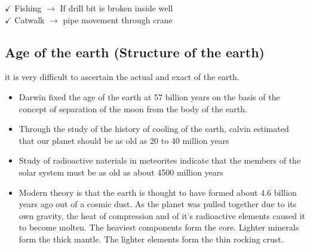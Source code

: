 \documentclass{article}
\begin{document}
$\checkmark$ Fishing $\rightarrow$ If drill bit is broken inside well \\
$\checkmark$ Catwalk $\rightarrow$ pipe movement through crane 

\subsection*{Age of the earth (Structure of the earth)}
it is very difficult to ascertain the actual and exact of the earth. 
\begin{itemize}
  \item Darwin fixed the age of the earth at 57 billion years on the basis of the concept of separation of the moon from the body of the earth.
  \item Through the study of the history of cooling of the earth, calvin estimated that our planet should be as old as 20 to 40 million years 
  \item Study of radioactive naterials in meteorites indicate that the members of the solar system must be as old as about 4500 million years 
  \item Modern theory is that the earth is thought to have formed about 4.6 billion years ago out of a cosmic dust. As the planet was pulled together due to its own gravity, the heat of compression and of it's radioactive elements caused it to become molten. The heaviest components form the core. Lighter minerals form the thick mantle. The lighter elements form the thin rocking crust. 
\end{itemize}
\end{document}
